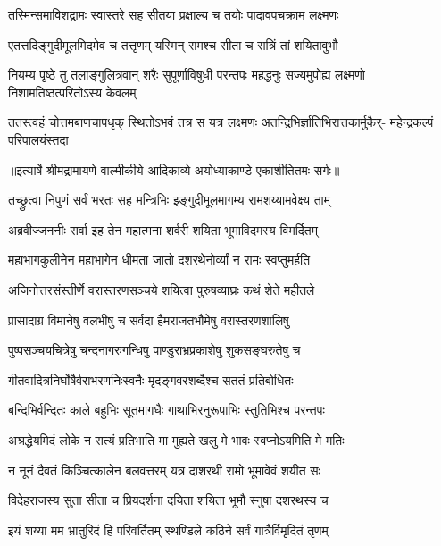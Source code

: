\twolineshloka
{तस्मिन्समाविशद्रामः स्वास्तरे सह सीतया}
{प्रक्षाल्य च तयोः पादावपचक्राम लक्ष्मणः} %

\twolineshloka
{एतत्तदिङ्गुदीमूलमिदमेव च तत्तृणम्}
{यस्मिन् रामश्च सीता च रात्रिं तां शयितावुभौ} %

\fourlineindentedshloka
{नियम्य पृष्ठे तु तलाङ्गुलित्रवान्}
{शरैः सुपूर्णाविषुधी परन्तपः}
{महद्धनुः सज्यमुपोह्य लक्ष्मणो}
{निशामतिष्ठत्परितोऽस्य केवलम्} %

\fourlineindentedshloka
{ततस्त्वहं चोत्तमबाणचापधृक्}
{स्थितोऽभवं तत्र स यत्र लक्ष्मणः}
{अतन्द्रिभिर्ज्ञातिभिरात्तकार्मुकैर्-}
{महेन्द्रकल्पं परिपालयंस्तदा} %


{॥इत्यार्षे श्रीमद्रामायणे वाल्मीकीये आदिकाव्ये अयोध्याकाण्डे एकाशीतितमः सर्गः॥}


\twolineshloka
{तच्छ्रुत्वा निपुणं सर्वं भरतः सह मन्त्रिभिः}
{इङ्गुदीमूलमागम्य रामशय्यामवेक्ष्य ताम्} %

\twolineshloka
{अब्रवीज्जननीः सर्वा इह तेन महात्मना}
{शर्वरी शयिता भूमाविदमस्य विमर्दितम्} %

\twolineshloka
{महाभागकुलीनेन महाभागेन धीमता}
{जातो दशरथेनोर्व्यां न रामः स्वप्तुमर्हति} %

\twolineshloka
{अजिनोत्तरसंस्तीर्णे वरास्तरणसञ्चये}
{शयित्वा पुरुषव्याघ्रः कथं शेते महीतले} %

\twolineshloka
{प्रासादाग्र विमानेषु वलभीषु च सर्वदा}
{हैमराजतभौमेषु वरास्तरणशालिषु} %

\twolineshloka
{पुष्पसञ्चयचित्रेषु चन्दनागरुगन्धिषु}
{पाण्डुराभ्रप्रकाशेषु शुकसङ्घरुतेषु च} %

\twolineshloka
{गीतवादित्रनिर्घोषैर्वराभरणनिःस्वनैः}
{मृदङ्गवरशब्दैश्च सततं प्रतिबोधितः} %

\twolineshloka
{बन्दिभिर्वन्दितः काले बहुभिः सूतमागधैः}
{गाथाभिरनुरूपाभिः स्तुतिभिश्च परन्तपः} %

\twolineshloka
{अश्रद्धेयमिदं लोके न सत्यं प्रतिभाति मा}
{मुह्यते खलु मे भावः स्वप्नोऽयमिति मे मतिः} %

\twolineshloka
{न नूनं दैवतं किञ्चित्कालेन बलवत्तरम्}
{यत्र दाशरथी रामो भूमावेवं शयीत सः} %

\twolineshloka
{विदेहराजस्य सुता सीता च प्रियदर्शना}
{दयिता शयिता भूमौ स्नुषा दशरथस्य च} %

\twolineshloka
{इयं शय्या मम भ्रातुरिदं हि परिवर्तितम्}
{स्थण्डिले कठिने सर्वं गात्रैर्विमृदितं तृणम्} %

